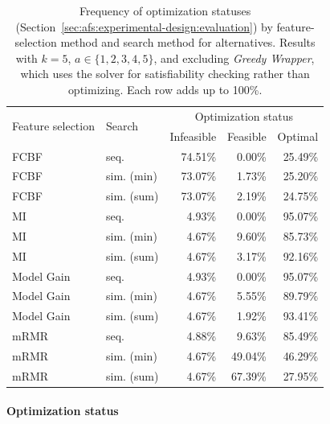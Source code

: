 \documentclass[iicol, sn-basic, Numbered]{sn-jnl} %
\theoremstyle{plain}
\theoremstyle{definition}
\begin{document}
\begin{table}[t]
	\centering
	\caption{
		Frequency of optimization statuses (Section~\ref{sec:afs:experimental-design:evaluation}) by feature-selection method and search method for alternatives.
		Results with $k=5$, $a \in \{1,2,3,4,5\}$, and excluding \emph{Greedy Wrapper}, which uses the solver for satisfiability checking rather than optimizing.
		Each row adds up to 100\%.
	}
	\begin{tabular}{llrrr}
		\toprule
		\multirow{2}{*}{Feature selection} & \multirow{2}{*}{Search} & \multicolumn{3}{c}{Optimization status} \\
		\cmidrule(r){3-5}
		& & Infeasible & Feasible & Optimal \\
		\midrule
		FCBF & seq. & 74.51\% & 0.00\% & 25.49\% \\
		FCBF & sim. (min) & 73.07\% & 1.73\% & 25.20\% \\
		FCBF & sim. (sum) & 73.07\% & 2.19\% & 24.75\% \\
		MI & seq. & 4.93\% & 0.00\% & 95.07\% \\
		MI & sim. (min) & 4.67\% & 9.60\% & 85.73\% \\
		MI & sim. (sum) & 4.67\% & 3.17\% & 92.16\% \\
		Model Gain & seq. & 4.93\% & 0.00\% & 95.07\% \\
		Model Gain & sim. (min) & 4.67\% & 5.55\% & 89.79\% \\
		Model Gain & sim. (sum) & 4.67\% & 1.92\% & 93.41\% \\
		mRMR & seq. & 4.88\% & 9.63\% & 85.49\% \\
		mRMR & sim. (min) & 4.67\% & 49.04\% & 46.29\% \\
		mRMR & sim. (sum) & 4.67\% & 67.39\% & 27.95\% \\
		\bottomrule
	\end{tabular}
	\label{tab:afs:impact-search-fs-method-optimization-status}
\end{table}

\paragraph{Optimization status}
\end{document}
